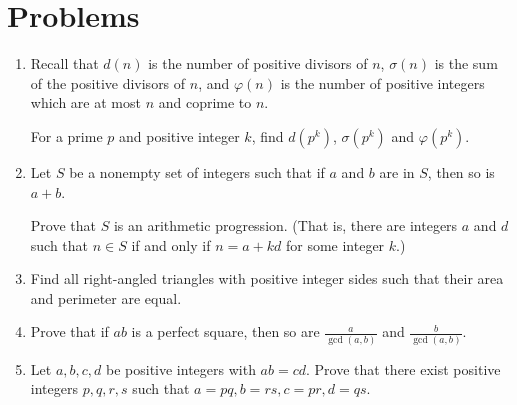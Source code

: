 \documentclass{article}
\begin{document}
\section{Problems}
\begin{enumerate}
  \item Recall that $d(n)$ is the number of positive divisors of $n$, $\sigma(n)$ is
    the sum of the positive divisors of $n$, and $\varphi(n)$ is the number of
    positive integers which are at most $n$ and coprime to $n$.

    For a prime $p$ and positive integer $k$, find $d(p^k)$, $\sigma(p^k)$ and
    $\varphi(p^k)$.
  \item Let $S$ be a nonempty set of integers such that if $a$ and $b$ are in $S$, then
    so is $a+b$.

    Prove that $S$ is an arithmetic
    progression. (That is, there are integers $a$ and $d$ such that $n\in S$ if
    and only if 
    $n=a+kd$ for some integer $k$.)
  \item Find all right-angled triangles with positive integer sides 
      such that their area and perimeter are equal.
  \item Prove that if $ab$ is a perfect square, then so are $\frac a{\gcd(a,b)}$ and
      $\frac b{\gcd(a,b)}$.
  \item Let $a,b,c,d$ be positive integers with $ab=cd$. Prove that there
    exist positive integers $p,q,r,s$ such that \(a=pq,b=rs,c=pr,d=qs\).
\end{enumerate}
\newpage
\end{document}
